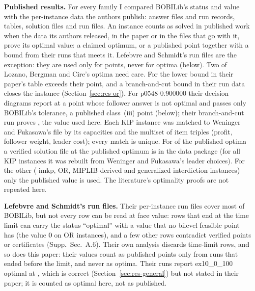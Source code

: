 \documentclass[]{spie}  %
\theoremstyle{plain}
\newcommand{\supp}[1]{Supp.\ Sec.~#1}
\newcommand{\inst}[1]{\mbox{#1}}             %
\newcommand{\cls}[1]{class~(#1)}             %
\begin{document}
\textbf{Published results.} For every family I compared BOBILib's status and value with the
per-instance data the authors publish: answer files and run records,\cite{weninger_bkpsolver}
tables, solution files\cite{lozano_dbo_repo} and run files.\cite{lefebvre2025dantzig} An
instance counts as solved in published work when the data its authors released, in the paper or in
the files that go with it, prove its optimal value: a claimed optimum, or a published point together
with a bound from their runs that meets it. Lefebvre and Schmidt's run files are the exception: they
are used only for points, never for optima (below). Two of Lozano, Bergman and Cire's optima need
care. For \inst{\OrClosureName} the lower bound in their paper's table exceeds their point, and a
branch-and-cut bound in their run data closes the instance (Section~\ref{sec:res-or}). For
\inst{p0548-0.900000} their decision diagrams report \PFiveFortyEightDd{} at a point whose follower answer is not
optimal and passes only BOBILib's tolerance, a published \cls{iii} point (below);
their branch-and-cut run proves \PFiveFortyEightOptimum{}, the value used here. Each KIP instance was
matched to Weninger and Fukasawa's file by its capacities and the
multiset of item triples (profit, follower weight, leader cost); every match is unique. For
\NumLitWithFile{} of the \NumLitOptimal{} published optima a verified solution file at the
published optimum is in the data package (for all \NumLitKip{} KIP instances it was rebuilt from
Weninger and Fukasawa's leader choices). For the other \NumLitNoFile{} (\NumLitNoFileImkp{} imkp,
\NumLitNoFileOr{} OR, \NumLitNoFileMiplib{} MIPLIB-derived and \NumLitNoFileGeneralized{}
generalized interdiction instances) only the published value is used. The literature's
optimality proofs are not repeated here.

\textbf{Lefebvre and Schmidt's run files.} Their per-instance run files cover most of BOBILib,
but not every row can be read at face value: rows that end at the time limit can carry the status
``optimal'' with a value that no bilevel feasible point has (the value 0 on \LsOrZeroOptimal{} OR
instances), and a few other rows contradict verified points or certificates (\supp{A.6}). Their own
analysis discards time-limit rows, and so does this paper: their values count as published points
only from runs that ended before the limit, and never as optima. Their runs report
\inst{ex10\_0\_100} optimal at \ExTenOptimum{}, which is correct (Section~\ref{sec:res-general}) but not
stated in their paper; it is counted as optimal here, not as published.
\end{document}
